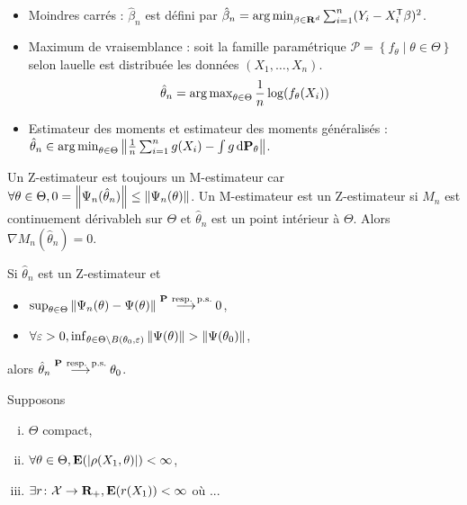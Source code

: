 	\begin{ex}
		\begin{itemize}
			\item[\textbullet] Moindres carrés : $\hat{\beta}_n$ est défini par $\hat{\beta}_n = \operatorname{arg\, min}_{\beta \in \mathbf{R}^d} \sum_{i = 1}^n (Y_i - X_i^\mathsf{T}\beta)^2$.
			\item[\textbullet] Maximum de vraisemblance : soit la famille paramétrique $\mathcal{P} = \left\{ f_{\theta} \mid \theta \in \Theta \right\}$ selon lauelle est distribuée les données $(X_1,\ldots,X_n)$.
				$$\hat{\theta}_n = \operatorname{arg\, max}_{\theta \in \Theta} \frac{1}{n} \log(f_{\theta}(X_i))$$
			\item[\textbullet] Estimateur des moments et estimateur des moments généralisés : $\hat{\theta}_n \in \operatorname{arg\, min}_{\theta \in \Theta} \left\lVert \frac{1}{n}\sum_{i = 1}^n g(X_i) - \int g \mathop{}\mathopen{}\mathrm{d} \mathbf{P}_\theta \right\rVert$.
		\end{itemize}
	\end{ex}

	\begin{rem}
		Un Z-estimateur est toujours un M-estimateur car $\forall \theta \in \Theta, 0 = \left\lVert\Psi_n(\hat{\theta}_n)\right\rVert \leq \left\lVert\Psi_n(\theta)\right\rVert$.
		Un M-estimateur est un Z-estimateur si $M_n$ est continuement dérivableh sur $\Theta$ et $\hat{\theta}_n$ est un point intérieur à $\Theta$.
		Alors $\nabla M_n(\hat{\theta}_n) = 0$.
	\end{rem}

	\begin{pop}[Consistance]
		
	\end{pop}

	\begin{pop}
		Si $\hat{\theta}_n$ est un Z-estimateur et
		\begin{itemize}
			\item[\textbullet] $\sup_{\theta \in \Theta} \left\lVert \Psi_n(\theta) - \Psi(\theta) \right\rVert \overset{\mathbf{P}\ \text{resp. p.s.}}{\longrightarrow} 0$,
			\item[\textbullet] $\forall \varepsilon > 0, \inf_{\theta \in \Theta \setminus B(\theta_0,\varepsilon)} \left\lVert\Psi(\theta)\right\rVert > \left\lVert\Psi(\theta_0)\right\rVert$,
		\end{itemize}
		alors $\hat{\theta}_n \overset{\proba\ \text{resp. p.s.}}{\longrightarrow} \theta_0$.
	\end{pop}

	\begin{lem}
		Supposons
		\begin{enumerate}[(i)]
			\item $\Theta$ compact,
			\item $\forall \theta \in \Theta, \mathbf{E}(\left\lvert\rho(X_1,\theta)\right\rvert) < \infty$,
			\item $\exists r \colon \mathcal{X} \to \mathbf{R}_+, \mathbf{E}(r(X_1)) < \infty$ où ...
		\end{enumerate}
	\end{lem}
